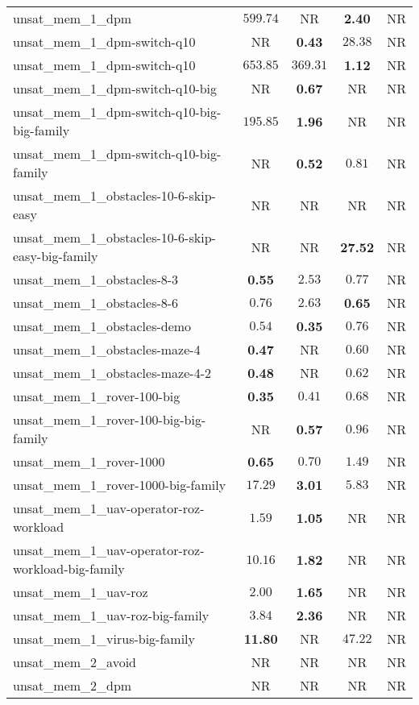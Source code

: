 \begin{tabular}{lcccc}
unsat\_mem\_1\_dpm & $599.74$ & NR & \textbf{2.40} & NR \\
unsat\_mem\_1\_dpm-switch-q10 & NR & \textbf{0.43} & $28.38$ & NR \\
unsat\_mem\_1\_dpm-switch-q10 & $653.85$ & $369.31$ & \textbf{1.12} & NR \\
unsat\_mem\_1\_dpm-switch-q10-big & NR & \textbf{0.67} & NR & NR \\
unsat\_mem\_1\_dpm-switch-q10-big-big-family & $195.85$ & \textbf{1.96} & NR & NR \\
unsat\_mem\_1\_dpm-switch-q10-big-family & NR & \textbf{0.52} & $0.81$ & NR \\
unsat\_mem\_1\_obstacles-10-6-skip-easy & NR & NR & NR & NR \\
unsat\_mem\_1\_obstacles-10-6-skip-easy-big-family & NR & NR & \textbf{27.52} & NR \\
unsat\_mem\_1\_obstacles-8-3 & \textbf{0.55} & $2.53$ & $0.77$ & NR \\
unsat\_mem\_1\_obstacles-8-6 & $0.76$ & $2.63$ & \textbf{0.65} & NR \\
unsat\_mem\_1\_obstacles-demo & $0.54$ & \textbf{0.35} & $0.76$ & NR \\
unsat\_mem\_1\_obstacles-maze-4 & \textbf{0.47} & NR & $0.60$ & NR \\
unsat\_mem\_1\_obstacles-maze-4-2 & \textbf{0.48} & NR & $0.62$ & NR \\
unsat\_mem\_1\_rover-100-big & \textbf{0.35} & $0.41$ & $0.68$ & NR \\
unsat\_mem\_1\_rover-100-big-big-family & NR & \textbf{0.57} & $0.96$ & NR \\
unsat\_mem\_1\_rover-1000 & \textbf{0.65} & $0.70$ & $1.49$ & NR \\
unsat\_mem\_1\_rover-1000-big-family & $17.29$ & \textbf{3.01} & $5.83$ & NR \\
unsat\_mem\_1\_uav-operator-roz-workload & $1.59$ & \textbf{1.05} & NR & NR \\
unsat\_mem\_1\_uav-operator-roz-workload-big-family & $10.16$ & \textbf{1.82} & NR & NR \\
unsat\_mem\_1\_uav-roz & $2.00$ & \textbf{1.65} & NR & NR \\
unsat\_mem\_1\_uav-roz-big-family & $3.84$ & \textbf{2.36} & NR & NR \\
unsat\_mem\_1\_virus-big-family & \textbf{11.80} & NR & $47.22$ & NR \\
unsat\_mem\_2\_avoid & NR & NR & NR & NR \\
unsat\_mem\_2\_dpm & NR & NR & NR & NR \\

\end{tabular}
